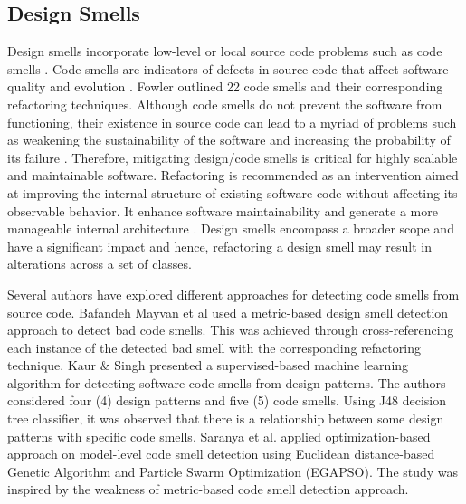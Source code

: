 \documentclass[AMA,Times1COL]{WileyNJDv5} %
\begin{document}
\subsection{Design Smells}
Design smells incorporate low-level or local source code problems such as code smells \cite{vaucher2009tracking}. Code smells are indicators of defects in source code that affect software quality and evolution \cite{soh2016code, oizumi2018identification,abuhassan2021software}. Fowler \cite{1999:RID:311424} outlined 22 code smells and their corresponding refactoring techniques. Although code smells do not prevent the software from functioning, their existence in source code can lead to a myriad of problems such as weakening the sustainability of the software and increasing the probability of its failure \cite{turkistani2019reducing}. Therefore, mitigating design/code smells is critical for highly scalable and maintainable software. Refactoring is recommended as an intervention aimed at improving the internal structure of existing software code without affecting its observable behavior. It enhance software maintainability and generate a more manageable internal architecture \cite{turkistani2019reducing}. Design smells encompass a broader scope and have a significant impact and hence, refactoring a design smell may result in alterations across a set of classes\cite{sharma2020empirical}.

Several authors have explored different approaches for detecting code smells from source code. Bafandeh Mayvan et al \cite{bafandeh2020bad} used a metric-based design smell detection approach to detect bad code smells. This was achieved through cross-referencing each instance of the detected bad smell with the corresponding refactoring technique. Kaur \& Singh \cite{kaur2018detecting} presented a supervised-based machine learning algorithm for detecting software code smells from design patterns. The authors considered four (4) design patterns and five (5) code smells. Using J48 decision tree classifier, it was observed that there is a relationship between some design patterns with specific code smells. Saranya et al. \cite{saranya2018model} applied optimization-based approach on model-level code smell detection using Euclidean distance-based Genetic Algorithm and Particle Swarm Optimization (EGAPSO). The study was inspired by the weakness of metric-based code smell detection approach.
\end{document}
